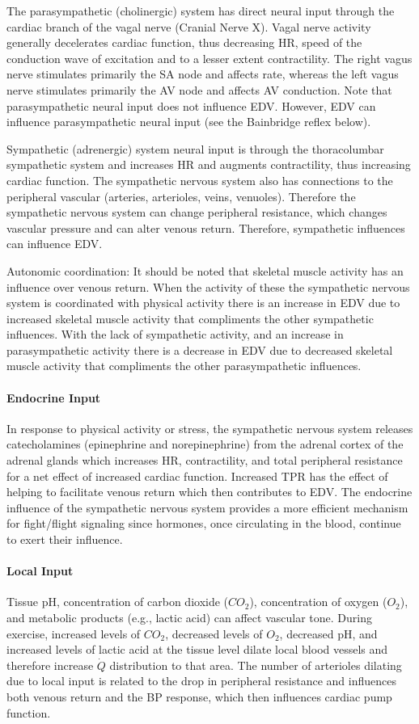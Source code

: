 The parasympathetic (cholinergic) system has direct neural input through the cardiac branch of the vagal nerve (Cranial Nerve X). Vagal nerve activity generally decelerates cardiac function, thus decreasing HR, speed of the conduction wave of excitation and to a lesser extent contractility. The right vagus nerve stimulates primarily the SA node and affects rate, whereas the left vagus nerve stimulates primarily the AV node and affects AV conduction. Note that parasympathetic neural input does not influence EDV. However, EDV can influence parasympathetic neural input (see the Bainbridge reflex below).

Sympathetic (adrenergic) system neural input is through the thoracolumbar sympathetic system and increases HR and augments contractility, thus increasing cardiac function. The sympathetic nervous system also has connections to the peripheral vascular (arteries, arterioles, veins, venuoles). Therefore the sympathetic nervous system can change peripheral resistance, which changes vascular pressure and can alter venous return. Therefore, sympathetic influences can influence EDV. 

Autonomic coordination: It should be noted that skeletal muscle activity has an influence over venous return. When the activity of these the sympathetic nervous system is coordinated with physical activity there is an increase in EDV due to increased skeletal muscle activity that compliments the other sympathetic influences. With the lack of sympathetic activity, and an increase in parasympathetic activity there is a decrease in EDV due to decreased skeletal muscle activity that compliments the other parasympathetic influences. 

\paragraph{Endocrine Input}
In response to physical activity or stress, the sympathetic nervous system releases catecholamines (epinephrine and norepinephrine) from the adrenal cortex of the adrenal glands which increases HR, contractility, and total peripheral resistance for a net effect of increased cardiac function. Increased TPR has the effect of helping to facilitate venous return which then contributes to EDV. The endocrine influence of the sympathetic nervous system provides a more efficient mechanism for fight/flight signaling since hormones, once circulating in the blood, continue to exert their influence. 

\paragraph{Local Input}
Tissue pH, concentration of carbon dioxide ($CO_2$), concentration of oxygen ($O_2$), and metabolic products (e.g., lactic acid) can affect vascular tone. During exercise, increased levels of $CO_2$, decreased levels of $O_2$, decreased pH, and increased levels of lactic acid at the tissue level dilate local blood vessels and therefore increase $\dot{Q}$ distribution to that area. The number of arterioles dilating due to local input is related to the drop in peripheral resistance and influences both venous return and the BP response, which then influences cardiac pump function. 

